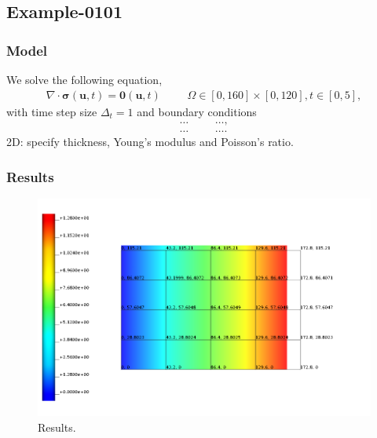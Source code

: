 %
\subsection{Example-0101}
%
%
\subsubsection{Model}
%
We solve the following equation,
%
\begin{align}
    \nabla \cdot \boldsymbol{\sigma} (\boldsymbol{u}, t) = \boldsymbol{0} (\boldsymbol{u}, t) & &&\Omega \in [0, 160] \times [0, 120], t \in [0, 5],
\end{align}
%
with time step size $\Delta_t = 1$ and boundary conditions
%
\begin{align}
    \ldots & && \ldots, \\
    \ldots & && \ldots.
\end{align}
%
2D: specify thickness, Young's modulus and Poisson's ratio.
%
%
\subsubsection{Results}
%
\begin{figure}[h!]
    \centering 
    \includegraphics[width=\columnwidth]{examples/example-0101/figures/example.png} 
    \caption{Results.}
    \label{example-0101-fig}
\end{figure}
%
